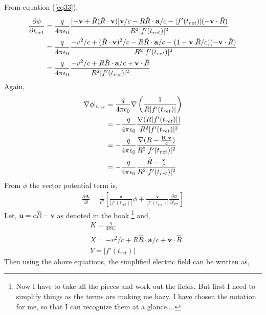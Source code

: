 \documentclass[11pt,a4paper]{article}
\begin{document}
From equation (\ref{eq33}),
\begin{align}
    \frac{\partial \phi}{\partial t_{ret}} &= \frac{q}{4\pi \epsilon_0} \frac{[-\mathbf{v} + \hat{R}(\hat{R}\cdot \mathbf{v})]\mathbf{v}/c - R\hat{R}\cdot \mathbf{a}/c - |f'(t_{ret})|(-\mathbf{v}\cdot \hat{R})}{R^2|f'(t_{ret})|^2} \notag \\
                                           &= \frac{q}{4\pi \epsilon_0} \frac{-v^2/c + (\hat{R}\cdot \mathbf{v})^2/c - R\hat{R}\cdot \mathbf{a}/c - (1-\mathbf{v}.\hat{R}/c)(-\mathbf{v}\cdot \hat{R})}{R^2|f'(t_{ret})|^2} \notag \\
                                           &= \frac{q}{4\pi \epsilon_0} \frac{-v^2/c + R\hat{R}\cdot \mathbf{a}/c + \mathbf{v}\cdot \hat{R}}{R^2|f'(t_{ret})|^2} \label{eq35}
\end{align}
Again,
\begin{align}
    \nabla \phi|_{t_{ret}} &= \frac{q}{4\pi \epsilon_0} \nabla \left( \frac{1}{R|f'(t_{ret})|} \right) \notag \\
                         &= -\frac{q}{4\pi \epsilon_0} \frac{\nabla (R|f'(t_{ret})|)}{R^2|f'(t_{ret})|^2} \notag \\
                         &= -\frac{q}{4\pi \epsilon_0} \frac{\nabla (R - \frac{\mathbf{R}\cdot \mathbf{v}}{c})}{R^2|f'(t_{ret})|^2} \notag \\
                         &= -\frac{q}{4\pi \epsilon_0} \frac{\hat{R} - \frac{\mathbf{v}}{c}}{R^2|f'(t_{ret})|^2} \label{eq36}
\end{align}
From $\phi$ the vector potential term is,
\begin{align}
\frac{\partial \mathbf{A}}{\partial t} = \frac{1}{c^2}\left[\frac{\mathbf{a}}{|f'(t_{ret})|}\phi + \frac{\mathbf{v}}{|f'(t_{ret})|}\frac{\partial \phi}{\partial t_{ret}}\right ] \label{eq37}
\end{align}
Let, $\mathbf{u} = c\hat{R} - \mathbf{v}$ as denoted in the book \cite{book}
\footnote{ Now I have to take all the pieces and work out the fields. 
But first I need to simplify things as the terms are making me hazy. 
I have chosen the notation for me, so that I can recognize them at a glance.... }
and,
\begin{align*}
    & K = \frac{q}{4\pi \epsilon_0} \\
    & X = -v^2/c + R\hat{R}\cdot \mathbf{a}/c + \mathbf{v}\cdot \hat{R} \\
    & Y = |f'(t_{ret})|
\end{align*}
Then using the above equations, the simplified electric field can be written as,
\end{document}
